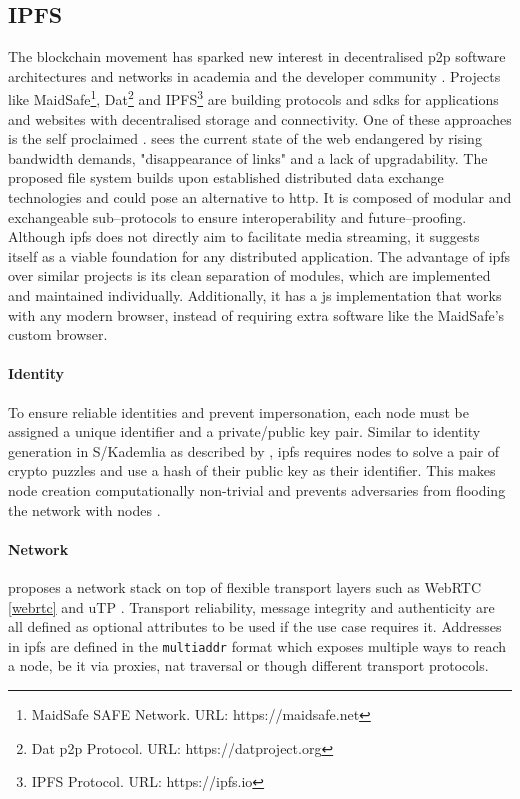 \subsection{IPFS}\label{chap:IPFS}

The blockchain movement has sparked new interest in decentralised \gls{p2p} software architectures and networks in academia and the developer community \cite{medium-dnets}. Projects like MaidSafe\footnote{MaidSafe SAFE Network. URL: {https://maidsafe.net}}, Dat\footnote{Dat \gls{p2p} Protocol. URL: {https://datproject.org}} and IPFS\footnote{\label{ipfs}IPFS Protocol. URL: {https://ipfs.io}} are building protocols and \glspl{sdk} for applications and websites with decentralised storage and connectivity. One of these approaches is the self proclaimed . \citet[\S.1]{ipfs-whitepaper} sees the current state of the web endangered by rising bandwidth demands, "disappearance of links" and a lack of upgradability. The proposed file system builds upon established distributed data exchange technologies and could pose an alternative to \gls{http}. It is composed of modular and exchangeable sub–protocols to ensure interoperability and future–proofing. Although \gls{ipfs} does not directly aim to facilitate media streaming, it suggests itself as a viable foundation for any distributed application. The advantage of \gls{ipfs} over similar projects is its clean separation of modules, which are implemented and maintained individually. Additionally, it has a \gls{js} implementation that works with any modern browser, instead of requiring extra software like the MaidSafe's custom browser.

\paragraph{Identity}
To ensure reliable identities and prevent impersonation, each node must be assigned a unique identifier and a private/public key pair. Similar to identity generation in S/Kademlia as described by \citet[\S4.1]{s_kademlia}, \gls{ipfs} requires nodes to solve a pair of crypto puzzles and use a hash of their public key as their identifier. This makes node creation computationally non-trivial and prevents adversaries from flooding the network with nodes \cite[\S3.2]{s_kademlia}.

\paragraph{Network}
\citet[\S3.2]{ipfs-whitepaper} proposes a network stack on top of flexible transport layers such as WebRTC \ref{webrtc} and uTP \cite{utp-micro-torrent-transport-protocol}. Transport reliability, message integrity and authenticity are all defined as optional attributes to be used if the use case requires it. Addresses in \gls{ipfs} are defined in the \lstinline|multiaddr| format which exposes multiple ways to reach a node, be it via proxies, \gls{nat} traversal or though different transport protocols.

